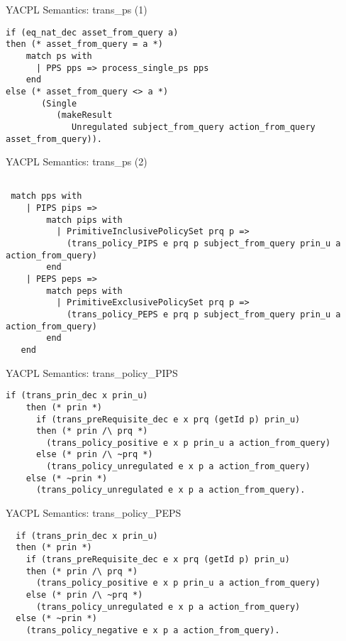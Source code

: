 \documentclass{beamer}
\begin{document}
\begin{frame}[fragile]{YACPL Semantics: trans\_ps (1)}
\lstset{language=Coq}
\begin{lstlisting}
if (eq_nat_dec asset_from_query a)
then (* asset_from_query = a *)  
    match ps with
      | PPS pps => process_single_ps pps
    end
else (* asset_from_query <> a *)
       (Single 
          (makeResult 
             Unregulated subject_from_query action_from_query asset_from_query)).

\end{lstlisting}
\end{frame}
\begin{frame}[fragile]{YACPL Semantics: trans\_ps (2)}
\lstset{language=Coq}
\begin{lstlisting}

 match pps with 
    | PIPS pips => 
        match pips with 
          | PrimitiveInclusivePolicySet prq p => 
            (trans_policy_PIPS e prq p subject_from_query prin_u a action_from_query)                
        end
    | PEPS peps => 
        match peps with 
          | PrimitiveExclusivePolicySet prq p => 
            (trans_policy_PEPS e prq p subject_from_query prin_u a action_from_query)
        end  
   end
\end{lstlisting}
\end{frame}
\begin{frame}[fragile]{YACPL Semantics: trans\_policy\_PIPS}
\lstset{language=Coq}
\begin{lstlisting}
if (trans_prin_dec x prin_u)
    then (* prin *)
      if (trans_preRequisite_dec e x prq (getId p) prin_u)
      then (* prin /\ prq *)
        (trans_policy_positive e x p prin_u a action_from_query)                           
      else (* prin /\ ~prq *)
        (trans_policy_unregulated e x p a action_from_query)
    else (* ~prin *)
      (trans_policy_unregulated e x p a action_from_query).

\end{lstlisting}
\end{frame}

\begin{frame}[fragile]{YACPL Semantics: trans\_policy\_PEPS}
\lstset{language=Coq}
\begin{lstlisting}
  if (trans_prin_dec x prin_u)
  then (* prin *)
    if (trans_preRequisite_dec e x prq (getId p) prin_u)
    then (* prin /\ prq *)
      (trans_policy_positive e x p prin_u a action_from_query)
    else (* prin /\ ~prq *)
      (trans_policy_unregulated e x p a action_from_query)
  else (* ~prin *)
    (trans_policy_negative e x p a action_from_query).

\end{lstlisting}
\end{frame}
\end{document}
